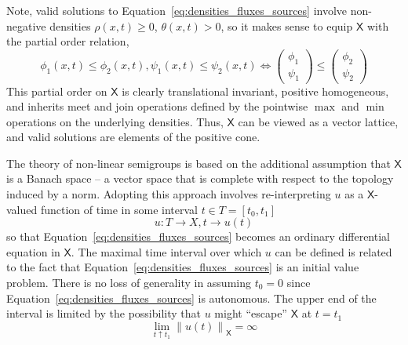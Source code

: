 \documentclass[12pt]{amsart}
\begin{document}
Note, valid solutions to Equation~\ref{eq:densities_fluxes_sources}
involve non-negative densities $\rho(x, t) \ge 0$, $\theta(x, t) > 0$,
so it makes sense to equip $\mathsf{X}$ with the partial order relation,
\begin{equation}
  \phi_1(x, t) \le \phi_2(x, t), \psi_1(x, t) \le \psi_2(x, t) \iff
  \begin{pmatrix}
    \phi_1 \\
    \psi_1
  \end{pmatrix} \le
  \begin{pmatrix}
    \phi_2 \\
    \psi_2
  \end{pmatrix}
\end{equation}
This partial order on $\mathsf{X}$ is clearly translational invariant, positive
homogeneous, and inherits meet and join operations defined by the
pointwise $\max$ and $\min$ operations on the underlying densities.
Thus, $\mathsf{X}$ can be viewed as a vector lattice, and valid solutions
are elements of the positive cone.

The theory of non-linear semigroups is based on the additional
assumption that $\mathsf{X}$ is a Banach space -- a vector space that is
complete with respect to the topology induced by a norm.  Adopting
this approach involves re-interpreting $u$ as a $\mathsf{X}$-valued function of
time in some interval $t\in T=\left[t_0, t_1\right]$
\begin{displaymath}
 u : T \rightarrow X, t \rightarrow u(t) 
\end{displaymath}
so that Equation~\ref{eq:densities_fluxes_sources} becomes an ordinary
differential equation in $\mathsf{X}$.  The maximal time interval over
which $u$ can be defined is related to the fact that
Equation~\ref{eq:densities_fluxes_sources} is an initial value
problem.  There is no loss of generality in assuming $t_0=0$ since
Equation~\ref{eq:densities_fluxes_sources} is autonomous.  The upper
end of the interval is limited by the possibility that $u$ might
``escape'' $\mathsf{X}$ at $t=t_1$
\begin{equation}
  \lim_{t\uparrow t_1} \left\|u(t)\right\|_{\mathsf{X}} = \infty
  \label{eq:u_escapes_X}
\end{equation}
\end{document}
